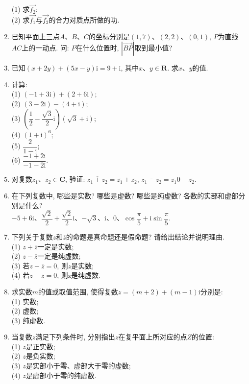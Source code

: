\documentclass[10pt,a4paper]{article}
\begin{document}
\begin{enumerate}[1.]
(1) 求$\overrightarrow{f_2}$;\\
(2) 求$\overrightarrow{f_1}$与$\overrightarrow{f_2}$的合力对质点所做的功.
\item 已知平面上三点$A$、$B$、$C$的坐标分别是$(1, 7)$、$(2, 2)$、$(0, 1)$, $P$为直线$AC$上的一动点. 问: $P$在什么位置时, $|\overrightarrow{BP}|$取到最小值?
\item 已知$(x+2y)+(5x-y)\mathrm{i}=9+\mathrm{i}$, 其中$x$、$y\in \mathbf{R}$. 求$x$、$y$的值.
\item 计算:\\
(1) $(-1+3\mathrm{i})+(2+6\mathrm{i})$;\\
(2) $(3-2\mathrm{i})-(4+\mathrm{i})$;\\
(3) $(\dfrac 12-\dfrac{\sqrt 3}2\mathrm{i})(\sqrt 3+\mathrm{i})$;\\
(4) $(1+\mathrm{i})^6$;\\
(5) $\dfrac2{1-\mathrm{i}}$;\\
(6) $\dfrac{-1+2\mathrm{i}}{-1-2\mathrm{i}}$.
\item 对复数$z_1$、$z_2\in \mathbf{C}$, 验证: $\overline{z_1+z_2}=\overline{z_1}+\overline{z_2}$, $\overline{z_1-z_2}=\overline{z_1}0-\overline{z_2}$.
\item 在下列复数中, 哪些是实数?  哪些是虚数?  哪些是纯虚数?  各数的实部和虚部分别是什么?\\
$-5+6\mathrm{i}$、$\dfrac{\sqrt 2}2+\dfrac{\sqrt 2}2\mathrm{i}$、$-\sqrt 3$、$\mathrm{i}$、$0$、$\cos \dfrac\pi 5+\mathrm{i}\sin\dfrac\pi 5$.
\item 下列关于复数$z$和$\overline z$的命题是真命题还是假命题? 请给出结论并说明理由.\\
(1) $z+\overline z$一定是实数;\\
(2) $z-\overline z$一定是纯虚数;\\
(3) $若z-\overline z=0$, 则$z$是实数;\\
(4) 若$z+\overline z=0$, 则z是纯虚数.
\item 求实数$m$的值或取值范围, 使得复数$z=(m+2)+(m-1)\mathrm{i}$分别是:\\
(1) 实数;\\
(2) 虚数;\\
(3) 纯虚数. 
\item 当复数$z$满足下列条件时, 分别指出$z$在复平面上所对应的点$Z$的位置:\\
(1) $z$是正实数;\\
(2) $z$是负实数;\\
(3) $z$是实部小于零、虚部大于零的虚数;\\
(4) $z$是虚部小于零的纯虚数.

\end{enumerate}
\end{document}
